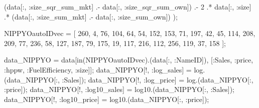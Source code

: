 \documentclass[
  letterpaper,
  DIV=11,
  numbers=noendperiod]{scrreprt}
\newenvironment{Shaded}{\begin{snugshade}}{\end{snugshade}}
\newcommand{\FloatTok}[1]{\textcolor[rgb]{0.68,0.00,0.00}{#1}}
\newcommand{\FunctionTok}[1]{\textcolor[rgb]{0.28,0.35,0.67}{#1}}
\newcommand{\NormalTok}[1]{\textcolor[rgb]{0.00,0.23,0.31}{#1}}
\newcommand{\OperatorTok}[1]{\textcolor[rgb]{0.37,0.37,0.37}{#1}}
\begin{document}
\begin{Shaded}
\begin{Highlighting}[]
\NormalTok{    (data[}\OperatorTok{:}\NormalTok{, }\OperatorTok{:}\NormalTok{size\_sqr\_sum\_mkt] }\OperatorTok{.{-}}\NormalTok{ data[}\OperatorTok{:}\NormalTok{, }\OperatorTok{:}\NormalTok{size\_sqr\_sum\_own]) }\OperatorTok{.{-}} 
    \FloatTok{2} \OperatorTok{.*}\NormalTok{ data[}\OperatorTok{:}\NormalTok{, }\OperatorTok{:}\NormalTok{size] }\OperatorTok{.*}\NormalTok{ (data[}\OperatorTok{:}\NormalTok{, }\OperatorTok{:}\NormalTok{size\_sum\_mkt] }\OperatorTok{.{-}}\NormalTok{ data[}\OperatorTok{:}\NormalTok{, }\OperatorTok{:}\NormalTok{size\_sum\_own])}
\NormalTok{);}
\end{Highlighting}
\end{Shaded}

\begin{Shaded}
\begin{Highlighting}[]
\NormalTok{NIPPYOautoIDvec }\OperatorTok{=}\NormalTok{ [}
    \FloatTok{260}\NormalTok{, }\FloatTok{4}\NormalTok{, }\FloatTok{76}\NormalTok{, }\FloatTok{104}\NormalTok{, }\FloatTok{64}\NormalTok{, }\FloatTok{54}\NormalTok{, }\FloatTok{152}\NormalTok{, }\FloatTok{153}\NormalTok{, }\FloatTok{71}\NormalTok{, }\FloatTok{197}\NormalTok{,}
    \FloatTok{42}\NormalTok{, }\FloatTok{45}\NormalTok{, }\FloatTok{114}\NormalTok{, }\FloatTok{208}\NormalTok{, }\FloatTok{209}\NormalTok{, }\FloatTok{77}\NormalTok{, }\FloatTok{236}\NormalTok{, }\FloatTok{58}\NormalTok{, }\FloatTok{127}\NormalTok{, }\FloatTok{187}\NormalTok{,}
    \FloatTok{79}\NormalTok{, }\FloatTok{175}\NormalTok{, }\FloatTok{19}\NormalTok{, }\FloatTok{117}\NormalTok{, }\FloatTok{216}\NormalTok{, }\FloatTok{112}\NormalTok{, }\FloatTok{256}\NormalTok{, }\FloatTok{119}\NormalTok{, }\FloatTok{37}\NormalTok{, }\FloatTok{158}
\NormalTok{];}
\end{Highlighting}
\end{Shaded}

\begin{Shaded}
\begin{Highlighting}[]
\NormalTok{data\_NIPPYO }\OperatorTok{=}\NormalTok{ data[}\FunctionTok{in}\NormalTok{(NIPPYOautoIDvec).(data[}\OperatorTok{:}\NormalTok{, }\OperatorTok{:}\NormalTok{NameID]), [}\OperatorTok{:}\NormalTok{Sales, }\OperatorTok{:}\NormalTok{price, }\OperatorTok{:}\NormalTok{hppw, }\OperatorTok{:}\NormalTok{FuelEfficiency, }\OperatorTok{:}\NormalTok{size]];}
\NormalTok{data\_NIPPYO[!, }\OperatorTok{:}\NormalTok{log\_sales] }\OperatorTok{=} \FunctionTok{log}\NormalTok{.(data\_NIPPYO[}\OperatorTok{:}\NormalTok{, }\OperatorTok{:}\NormalTok{Sales]);}
\NormalTok{data\_NIPPYO[!, }\OperatorTok{:}\NormalTok{log\_price] }\OperatorTok{=} \FunctionTok{log}\NormalTok{.(data\_NIPPYO[}\OperatorTok{:}\NormalTok{, }\OperatorTok{:}\NormalTok{price]);}
\NormalTok{data\_NIPPYO[!, }\OperatorTok{:}\NormalTok{log10\_sales] }\OperatorTok{=} \FunctionTok{log10}\NormalTok{.(data\_NIPPYO[}\OperatorTok{:}\NormalTok{, }\OperatorTok{:}\NormalTok{Sales]);}
\NormalTok{data\_NIPPYO[!, }\OperatorTok{:}\NormalTok{log10\_price] }\OperatorTok{=} \FunctionTok{log10}\NormalTok{.(data\_NIPPYO[}\OperatorTok{:}\NormalTok{, }\OperatorTok{:}\NormalTok{price]);}
\end{Highlighting}
\end{Shaded}
\end{document}
